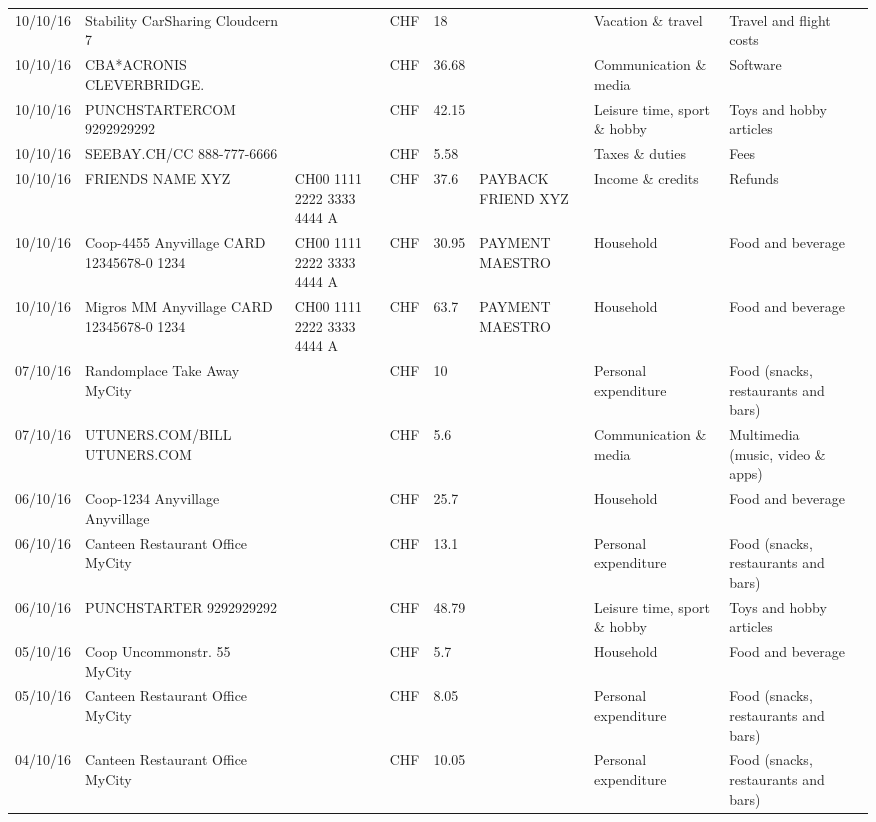 \begin{landscape}
\begin{tiny}
\begin{longtable}{lp{4cm}llllp{3cm}ll}
		    10/10/16 & Stability CarSharing      Cloudcern 7 &       & CHF   & 18    &       & Vacation \& travel & Travel and flight costs \\
		    10/10/16 & CBA*ACRONIS              CLEVERBRIDGE. &       & CHF   & 36.68 &       & Communication \& media & Software \\
		    10/10/16 & PUNCHSTARTERCOM           9292929292 &       & CHF   & 42.15 &       & Leisure time, sport \& hobby & Toys and hobby articles \\
		    10/10/16 & SEEBAY.CH/CC               888-777-6666 &       & CHF   & 5.58  &       & Taxes \& duties & Fees \\
		    10/10/16 & FRIENDS NAME XYZ & CH00 1111 2222 3333 4444 A & CHF   & 37.6  & PAYBACK FRIEND XYZ & Income \& credits & Refunds \\
		    10/10/16 & Coop-4455 Anyvillage CARD 12345678-0 1234 & CH00 1111 2222 3333 4444 A & CHF   & 30.95 & PAYMENT MAESTRO & Household & Food and beverage \\
		    10/10/16 & Migros MM Anyvillage CARD 12345678-0 1234 & CH00 1111 2222 3333 4444 A & CHF   & 63.7  & PAYMENT MAESTRO & Household & Food and beverage \\
		    07/10/16 & Randomplace Take Away     MyCity &       & CHF   & 10    &       & Personal expenditure & Food (snacks, restaurants and bars) \\
		    07/10/16 & UTUNERS.COM/BILL          UTUNERS.COM &       & CHF   & 5.6   &       & Communication \& media & Multimedia (music, video \& apps) \\
		    06/10/16 & Coop-1234 Anyvillage    Anyvillage &       & CHF   & 25.7  &       & Household & Food and beverage \\
		    06/10/16 & Canteen Restaurant Office      MyCity &       & CHF   & 13.1  &       & Personal expenditure & Food (snacks, restaurants and bars) \\
		    06/10/16 & PUNCHSTARTER     9292929292 &       & CHF   & 48.79 &       & Leisure time, sport \& hobby & Toys and hobby articles \\
		    05/10/16 & Coop Uncommonstr. 55   MyCity &       & CHF   & 5.7   &       & Household & Food and beverage \\
		    05/10/16 & Canteen Restaurant Office      MyCity &       & CHF   & 8.05  &       & Personal expenditure & Food (snacks, restaurants and bars) \\
		    04/10/16 & Canteen Restaurant Office      MyCity &       & CHF   & 10.05 &       & Personal expenditure & Food (snacks, restaurants and bars) \\

\end{longtable}
\end{tiny}
\end{landscape}

